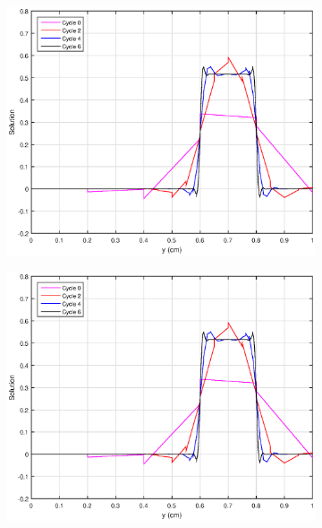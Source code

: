 \begin{figure}
	\hfill
	\begin{subfigure}[b]{0.45\textwidth}
		\centering
		\label{subfig::SL_uniform_ef_mv}
		\includegraphics[width=\textwidth]{figures/sec_BF/SL_MV_uniform.eps}
		\caption{}
	\end{subfigure}
	\vfill
	\begin{subfigure}[b]{0.45\textwidth}
		\centering
		\label{subfig::SL_uniform_ef_me1}
		\includegraphics[width=\textwidth]{figures/sec_BF/SL_ME_k1_uniform.eps}
		\caption{}
	\end{subfigure}
	\hfill
	\begin{subfigure}[b]{0.45\textwidth}

\end{subfigure}
\end{figure}
